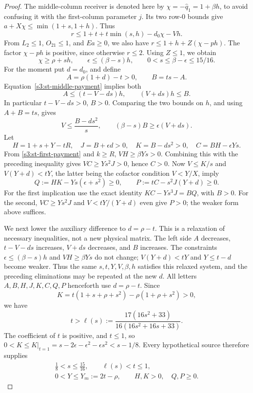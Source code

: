 \documentclass[11pt,reqno]{amsart}
\theoremstyle{definition}
\theoremstyle{remark}
\begin{document}
\begin{proof}
The middle-column receiver is denoted here by
\(\chi=-\widehat q_1=1+\beta h\), to avoid confusing it
with the first-column parameter \(j\). Its two row-0 bounds give
\(a+X\chi\le\min(1+s,1+h)\). Thus
\begin{equation}\label{s3:st-middle-payment}
 r\le1+t+t\min(s,h)-d_0\chi-Vh.
\end{equation}
From \(L_2\le1\), \(O_{21}\le1\), and \(Ea\ge0\),
we also have \(r\le1+h+Z(\chi-ph)\).
The factor \(\chi-ph\) is positive, since otherwise \(r\le2\).
Using \(Z\le1\), we obtain
\[
 \chi\ge\rho+sh,\qquad
 \epsilon\le(\beta-s)h,
 \qquad0<s\le\beta-\epsilon\le15/16.
\]
For the moment put \(d=d_0\), and define
\[
 A=\rho(1+d)-t>0,\qquad B=ts-A.
\]
Equation~\eqref{s3:st-middle-payment} implies both
\[
 A\le(t-V-ds)h,\qquad (V+ds)h\le B.
\]
In particular \(t-V-ds>0\), \(B>0\). Comparing the two
bounds on \(h\), and using \(A+B=ts\), gives
\[
 V\le\frac{B-ds^2}{s},\qquad
 (\beta-s)B\ge\epsilon(V+ds).
\]
Let
\[
 H=1+s+Y-tR,\quad J=B+\epsilon d>0,\quad
 K=B-ds^2>0,\quad C=BH-\epsilon Ys.
\]
From \eqref{s3:st-first-payment} and \(k\ge R\),
\(VH\ge\beta Ys>0\). Combining this with the preceding
inequality gives \(VC\ge Ys^2J>0\), hence \(C>0\).
Now \(V\le K/s\) and
\(V(Y+d)<tY\), the latter being the cofactor condition
\(V<Y/X\), imply
\begin{equation}\label{s3:st-two-polynomials}
 Q:=HK-Ys(\epsilon+s^2)\ge0,
 \qquad P:=tC-s^2J(Y+d)\ge0.
\end{equation}
For the first implication use the exact identity
\(KC-Ys^3J=BQ\), with \(B>0\). For the second,
\(VC\ge Ys^2J\) and \(V<tY/(Y+d)\) even give \(P>0\);
the weaker form above suffices.

We next lower the auxiliary difference to \(d=\rho-t\).
This is a relaxation of necessary inequalities, not a new physical
matrix. The left side \(A\) decreases, \(t-V-ds\) increases,
\(V+ds\) decreases, and \(B\) increases. The constraints
\(\epsilon\le(\beta-s)h\) and \(VH\ge\beta Ys\) do not
change; \(V(Y+d)<tY\) and \(Y\le t-d\) become weaker.
Thus the same \(s,t,Y,V,\beta,h\) satisfies this relaxed system,
and the preceding eliminations may be repeated at the new \(d\).
All letters \(A,B,H,J,K,C,Q,P\) henceforth use
\(d=\rho-t\). Since
\[
 K=t(1+s+\rho+s^2)-\rho(1+\rho+s^2)>0,
\]
we have
\[
 t>\ell(s):=\frac{17(16s^2+33)}{16(16s^2+16s+33)}.
\]
The coefficient of \(t\) is positive, and \(t\le1\), so
\(0<K\le K|_{t=1}=s-2\epsilon-\epsilon^2-\epsilon s^2
<s-1/8\). Every hypothetical source therefore supplies
\begin{equation}\label{s3:st-scalar-domain}
 \begin{gathered}\frac18<s\le\frac{15}{16},\qquad
 \ell(s)<t\le1,\\ 0<Y\le Y_m:=2t-\rho,\qquad H,K>0,\quad Q,P\ge0.
 \end{gathered}\end{equation}


\end{proof}
\end{document}
